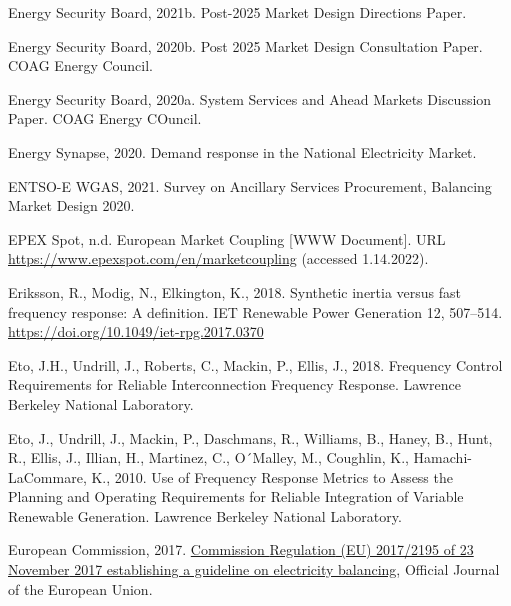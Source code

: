 \documentclass[12pt,a4paper,]{report}
\newlength{\cslhangindent}
\newenvironment{CSLReferences}[2] %
 {%
  \setlength{\parindent}{0pt}
  \ifodd #1 \everypar{\setlength{\hangindent}{\cslhangindent}}\ignorespaces\fi
  \ifnum #2 > 0
  \setlength{\parskip}{#2\baselineskip}
  \fi
 }%
 {}
\begin{document}
\begin{CSLReferences}{1}{0}
\leavevmode{}%
Energy Security Board, 2021b. Post-2025 {Market Design Directions
Paper}.

\leavevmode{}%
Energy Security Board, 2020b. Post 2025 {Market Design Consultation
Paper}. COAG Energy Council.

\leavevmode{}%
Energy Security Board, 2020a. System {Services} and {Ahead Markets
Discussion Paper}. COAG Energy COuncil.

\leavevmode{}%
Energy Synapse, 2020. Demand response in the {National Electricity
Market}.

\leavevmode{}%
ENTSO-E WGAS, 2021. Survey on {Ancillary Services Procurement},
{Balancing Market Design} 2020.

\leavevmode{}%
EPEX Spot, n.d. European {Market Coupling} {[}WWW Document{]}. URL
\url{https://www.epexspot.com/en/marketcoupling} (accessed 1.14.2022).

\leavevmode{}%
Eriksson, R., Modig, N., Elkington, K., 2018. Synthetic inertia versus
fast frequency response: {A} definition. IET Renewable Power Generation
12, 507--514. \url{https://doi.org/10.1049/iet-rpg.2017.0370}

\leavevmode{}%
Eto, J.H., Undrill, J., Roberts, C., Mackin, P., Ellis, J., 2018.
Frequency {Control Requirements} for {Reliable Interconnection Frequency
Response}. Lawrence Berkeley National Laboratory.

\leavevmode{}%
Eto, J., Undrill, J., Mackin, P., Daschmans, R., Williams, B., Haney,
B., Hunt, R., Ellis, J., Illian, H., Martinez, C., O´Malley, M.,
Coughlin, K., Hamachi-LaCommare, K., 2010. Use of {Frequency Response
Metrics} to {Assess} the {Planning} and {Operating Requirements} for
{Reliable Integration} of {Variable Renewable Generation}. Lawrence
Berkeley National Laboratory.

\leavevmode{}%
European Commission, 2017.
\href{https://eur-lex.europa.eu/legal-content/EN/TXT/?uri=uriserv:OJ.L_.2017.312.01.0006.01.ENG&toc=OJ:L:2017:312:TOC\#d1e4442-6-1}{Commission
{Regulation} ({EU}) 2017/2195 of 23 {November} 2017 establishing a
guideline on electricity balancing}, Official Journal of the European
Union.


\end{CSLReferences}
\end{document}
